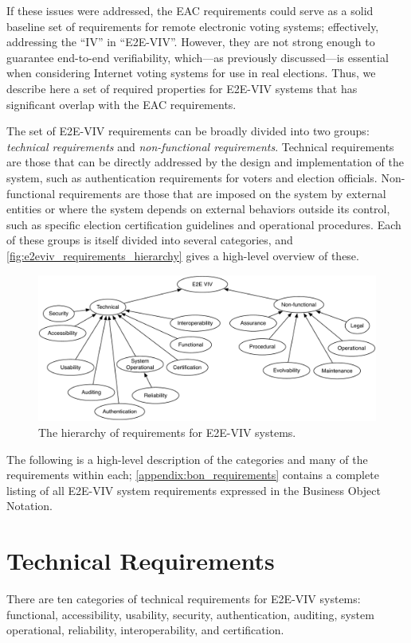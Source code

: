 If these issues were addressed, the EAC requirements could serve as a
solid baseline set of requirements for remote electronic voting
systems; effectively, addressing the ``IV'' in ``E2E-VIV''. However,
they are not strong enough to guarantee end-to-end verifiability,
which---as previously discussed---is essential when considering
Internet voting systems for use in real elections.  Thus, we describe
here a set of required properties for E2E-VIV systems that has
significant overlap with the EAC requirements.

The set of E2E-VIV requirements can be broadly divided into two
groups: \emph{technical requirements} and \emph{non-functional
  requirements}. Technical requirements are those that can be directly
addressed by the design and implementation of the system, such as
authentication requirements for voters and election
officials. Non-functional requirements are those that are imposed on
the system by external entities or where the system depends on
external behaviors outside its control, such as specific election
certification guidelines and operational procedures. Each of these
groups is itself divided into several categories, and
\autoref{fig:e2eviv_requirements_hierarchy} gives a high-level
overview of these.

\begin{figure}
\begin{center}
\includegraphics[width=6in]{required_properties_resources/hierarchy}
\end{center}
\caption{The hierarchy of requirements for E2E-VIV systems.}
\label{fig:e2eviv_requirements_hierarchy}
\end{figure}

The following is a high-level description of the categories and many
of the requirements within each; \autoref{appendix:bon_requirements}
contains a complete listing of all E2E-VIV system requirements
expressed in the Business Object Notation.

\section{Technical Requirements}
There are ten categories of technical requirements for E2E-VIV
systems: functional, accessibility, usability, security,
authentication, auditing, system operational, reliability,
interoperability, and certification. 

